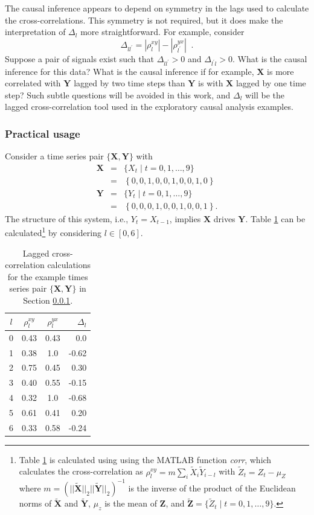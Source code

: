 \documentclass{article}[10pt]
\begin{document}
The causal inference appears to depend on symmetry in the lags used to calculate the cross-correlations.  This symmetry is not required, but it does make the interpretation of $\Delta_l$ more straightforward.  For example, consider
\begin{equation}
\Delta_{ll^\prime} = |\rho^{xy}_l| - |\rho^{yx}_{l^\prime}|\;\;.
\end{equation}
Suppose a pair of signals exist such that $\Delta_{ll^\prime}>0$ and $\Delta_{l^\prime l}>0$.  What is the causal inference for this data?  What is the causal inference if for example, $\mathbf{X}$ is more correlated with $\mathbf{Y}$ lagged by two time steps than $\mathbf{Y}$ is with $\mathbf{X}$ lagged by one time step?  Such subtle questions will be avoided in this work, and $\Delta_l$ will be the lagged cross-correlation tool used in the exploratory causal analysis examples.

\subsubsection{Practical usage}
\label{sec:lccPUSE}
Consider a time series pair $\{\mathbf{X},\mathbf{Y}\}$ with
\begin{eqnarray*}
\mathbf{X} &=& \{X_t\; | \; t=0,1,\ldots,9\}\\
&=& \left\{0,0,1,0,0,1,0,0,1,0\right\}\\
\mathbf{Y} &=& \{Y_t\; | \; t=0,1,\ldots,9\}\\
&=& \left\{0,0,0,1,0,0,1,0,0,1\right\}.
\end{eqnarray*}
The structure of this system, i.e., $Y_t=X_{t-1}$, implies $\mathbf{X}$ drives $\mathbf{Y}$.  Table \ref{tab:lccEx} can be calculated\footnote{Table \ref{tab:lccEx} is calculated using using the {\sc MATLAB} function {\em corr}, which calculates the cross-correlation as $\rho_l^{xy} = m \sum_i \tilde{X}_i \tilde{Y}_{i-l}$ with $\tilde{Z}_t = Z_t-\mu_Z$ where $m=\left(||\tilde{\mathbf{X}}||_2||\tilde{\mathbf{Y}}||_2\right)^{-1}$ is the inverse of the product of the Euclidean norms of $\tilde{\mathbf{X}}$ and $\tilde{\mathbf{Y}}$, $\mu_z$ is the mean of $\mathbf{Z}$, and $\tilde{\mathbf{Z}} = \{\tilde{Z}_t\;|\;t=0,1,\ldots,9\}$.} by considering $l\in[0,6]$.
\begin{table}
\begin{center}
\begin{tabular}{ccc|r}
$l$ & $\rho^{xy}_l$ & $\rho^{yx}_l$ & $\Delta_l$\\
\midrule
0 & 0.43 & 0.43 & 0.0\\
1 & 0.38 & 1.0 & -0.62 \\
2 & 0.75 & 0.45 & 0.30 \\
3 & 0.40 & 0.55 & -0.15 \\
4 & 0.32 & 1.0 & -0.68 \\
5 & 0.61 & 0.41 & 0.20 \\
6 & 0.33 & 0.58 & -0.24
\end{tabular}
\caption{Lagged cross-correlation calculations for the example times series pair $\{\mathbf{X},\mathbf{Y}\}$ in Section \ref{sec:lccPUSE}.}
\label{tab:lccEx}
\end{center}
\end{table}
\end{document}
